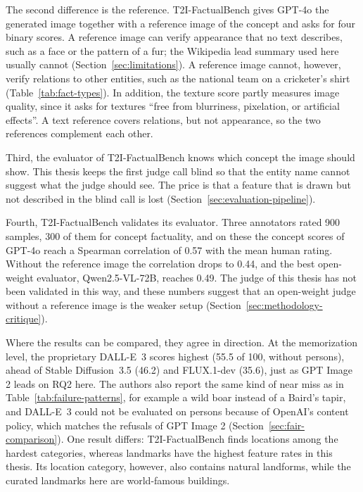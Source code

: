 The second difference is the reference. T2I-FactualBench gives GPT-4o the
generated image together with a reference image of the concept and asks for
four binary scores. A reference image can verify appearance that no text
describes, such as a face or the pattern of a fur; the Wikipedia lead summary
used here usually cannot (Section~\ref{sec:limitations}). A reference image
cannot, however, verify relations to other entities, such as the national team
on a cricketer's shirt (Table~\ref{tab:fact-types}). In addition, the texture
score partly measures image quality, since it asks for textures ``free from
blurriness, pixelation, or artificial effects''. A text reference covers
relations, but not appearance, so the two references complement each other.

Third, the evaluator of T2I-FactualBench knows which concept the image should
show. This thesis keeps the first judge call blind so that the entity name
cannot suggest what the judge should see. The price is that a feature that is
drawn but not described in the blind call is lost
(Section~\ref{sec:evaluation-pipeline}).

Fourth, T2I-FactualBench validates its evaluator. Three annotators rated 900
samples, 300 of them for concept factuality, and on these the concept scores
of GPT-4o reach a Spearman correlation of 0.57 with the mean human rating. Without the reference image the correlation drops
to 0.44, and the best open-weight evaluator, Qwen2.5-VL-72B, reaches 0.49. The
judge of this thesis has not been validated in this way, and these numbers
suggest that an open-weight judge without a reference image is the weaker
setup (Section~\ref{sec:methodology-critique}).

Where the results can be compared, they agree in direction. At the
memorization level, the proprietary DALL-E~3 scores highest (55.5 of 100,
without persons),
ahead of Stable Diffusion~3.5 (46.2) and FLUX.1-dev (35.6), just as GPT Image 2
leads on RQ2 here. The authors also report the same kind of near miss as in
Table~\ref{tab:failure-patterns}, for example a wild boar instead of a Baird's
tapir, and DALL-E~3 could not be evaluated on persons because of OpenAI's
content policy, which matches the refusals of GPT Image 2
(Section~\ref{sec:fair-comparison}). One result differs: T2I-FactualBench finds
locations among the hardest categories, whereas landmarks have the highest
feature rates in this thesis. Its location category, however, also contains
natural landforms, while the curated landmarks here are world-famous buildings.

